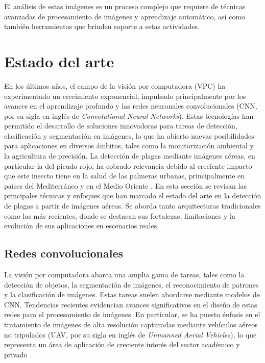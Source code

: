 
El análisis de estas imágenes es un proceso complejo que requiere de técnicas avanzadas de procesamiento de imágenes y aprendizaje automático, así como también herramientas que brinden soporte a estas actividades.

\section{Estado del arte}
\label{sec:estadoArte}

En los últimos años, el campo de la visión por computadora (VPC) ha experimentado un crecimiento exponencial, impulsado principalmente por los avances en el aprendizaje profundo y las redes neuronales convolucionales (CNN, por su sigla en inglés de \textit{Convolutional Neural Networks}). Estas tecnologías han permitido el desarrollo de soluciones innovadoras para tareas de detección, clasificación y segmentación en imágenes, lo que ha abierto nuevas posibilidades para aplicaciones en diversos ámbitos, tales como la monitorización ambiental y la agricultura de precisión. La detección de plagas mediante imágenes aéreas, en particular la del picudo rojo, ha cobrado relevancia debido al creciente impacto que este insecto tiene en la salud de las palmeras urbanas, principalmente en países del Mediterráneo y en el Medio Oriente \citep{poplin_palm_2014}.
En esta sección se revisan las principales técnicas y enfoques que han marcado el estado del arte en la detección de plagas a partir de imágenes aéreas. Se aborda tanto arquitecturas tradicionales como las más recientes, donde se destacan sus fortalezas, limitaciones y la evolución de sus aplicaciones en escenarios reales.

\subsection{Redes convolucionales}
\label{sec:redesConvolucionales}

La visión por computadora abarca una amplia gama de tareas, tales como la detección de objetos, la segmentación de imágenes, el reconocimiento de patrones y la clasificación de imágenes. Estas tareas suelen abordarse mediante modelos de CNN. Tendencias recientes evidencian avances significativos en el diseño de estas redes para el procesamiento de imágenes. En particular, se ha puesto énfasis en el tratamiento de imágenes de alta resolución capturadas mediante vehículos aéreos no tripulados (UAV, por su sigla en inglés de \textit{Unmanned Aerial Vehicles}), lo que representa un área de aplicación de creciente interés del sector académico y privado \citep{gao_recent_2024} \citep{sutar_convolutional_2025}.

